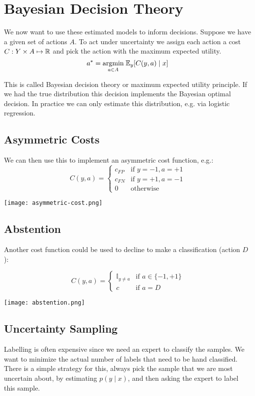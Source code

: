\section{Bayesian Decision Theory}

We now want to use these estimated models to inform decisions. Suppose we have a given set of actions $A$. To act under uncertainty we assign each action a cost $C: Y \times A \mapsto \mathbb{R}$ and pick the action with the maximum expected utility. 
$$a^* = \underset{a \in A}{\text{argmin}} \; \mathbb{E}_y[C(y,a) \; | \; x]$$

This is called Bayesian decision theory or maximum expected utility principle. If we had the true distribution this decision implements the Bayesian optimal decision. In practice we can only estimate this distribution, e.g. via logistic regression.

\subsection{Asymmetric Costs}

We can then use this to implement an asymmetric cost function, e.g.:
$$C(y,a) = \begin{cases}
	c_{FP} & \text{if } y=-1, a=+1 \\
	c_{FN} & \text{if } y=+1, a=-1 \\
	0 & \text{otherwise}
\end{cases}$$

\texttt{[image: asymmetric-cost.png]}

\subsection{Abstention}

Another cost function could be used to decline to make a classification (action $D$):

$$C(y,a) = \begin{cases}
	\mathbb{I}_{y \neq a} & \text{if } a \in \{-1, +1\} \\
	c & \text{if } a = D
\end{cases}$$

\texttt{[image: abstention.png]}

\subsection{Uncertainty Sampling}

Labelling is often expensive since we need an expert to classify the samples. We want to minimize the actual number of labels that need to be hand classified. There is a simple strategy for this, always pick the sample that we are most uncertain about, by estimating $p(y \; | \; x)$, and then asking the expert to label this sample.